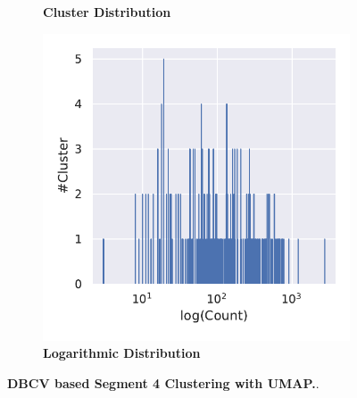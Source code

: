 \begin{figure}
\begin{adjustbox}{minipage=\dimexpr{}\fboxrule,fbox}
\begin{subfigure}[b]{0.475\textwidth}
            \caption[Cluster Distribution]{\textbf{Cluster Distribution}}
            \label{subfig:UMAP_Cluster_DBCV_Distribution_4}
        \end{subfigure}
        \hfill
        \begin{subfigure}[b]{0.475\textwidth}
            \includegraphics[width=\textwidth]{UMAP/Cluster_Distribution_Log_Segment_4_alternative.pdf}
            \caption[Logarithmic Distribution]{\textbf{Logarithmic Distribution}}
            \label{subfig:UMAP_Cluster_DBCV_Distribution_log_4}
        \end{subfigure}
    \end{adjustbox}
    \caption[\Acrshort{DBCV} based Segment 4 Clustering with UMAP]{\textbf{\Acrshort{DBCV} based Segment 4 Clustering with \Acrshort{UMAP}.}.}
    \label{fig:UMAP_Cluster_DBCV_4}
\end{figure}

